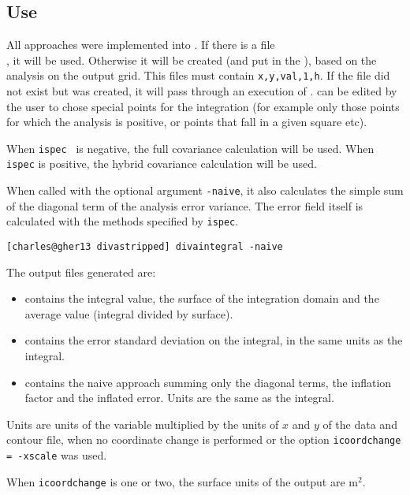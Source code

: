 \subsection{Use}

All approaches were implemented into . If there is a file\\ 
, it will be used.
Otherwise it will be created (and put in the ), based on the analysis on the output grid. This files must contain \texttt{x,y,val,1,h}. If the file did not exist but was created, it will pass through an execution of . 
 can be edited by the user to chose special points for the integration (for example only those points for which the analysis is positive, or points that fall in a given square etc). 

When {\tt ispec } is negative, the full covariance calculation will be used. When {\tt ispec} is positive, the hybrid covariance calculation will be used.

When called with the optional argument \texttt{-naive}, it also calculates the simple sum of the diagonal term of the analysis error variance. The error field itself is calculated with the methods specified by \texttt{ispec}. 

\begin{lstlisting}[style=Bash]
[charles@gher13 divastripped] divaintegral -naive
\end{lstlisting}

The output files generated are:
\begin{itemize}
\item {} contains the integral value, the surface of the integration domain and the average value (integral divided by surface).
\item {} contains the error standard deviation on the integral, in the same units as the integral.
\item {} contains the naive approach summing only the diagonal terms, the inflation factor and the inflated error. Units are the same as the integral.
\end{itemize}

Units are units of the variable multiplied by the units of $x$ and $y$ of the data and contour file, when no coordinate change is performed or the option {\tt icoordchange = -xscale} was used.

When {\tt icoordchange} is one or two, the surface units of the output are m$^2$.

